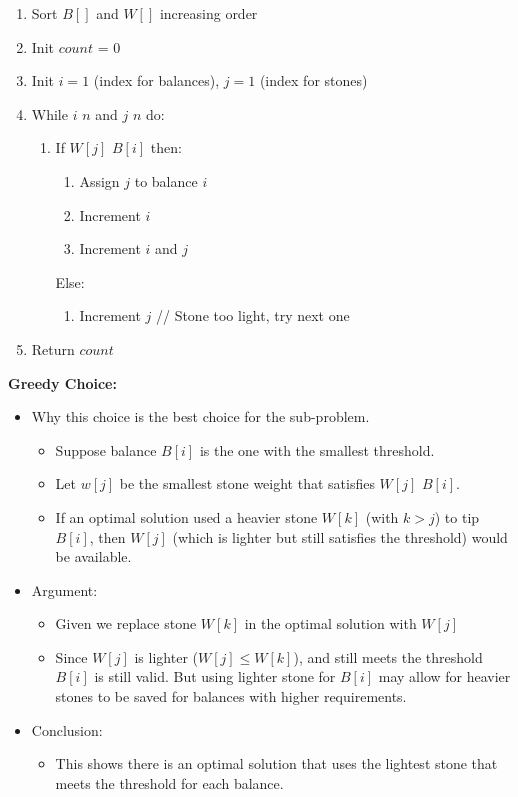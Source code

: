 \documentclass{article}[12pt]
\begin{document}
\begin{enumerate}
  \item Sort $B[]$ and $W[]$ increasing order
  \item Init $count$ = 0
  \item Init $i = 1$ (index for balances), $j = 1$ (index for stones)
  \item While $i$ \leq $n$ and $j$ \leq $n$ do:
    \begin{enumerate}
      \item If $W[j]$ \leq $B[i]$ then:
        \begin{enumerate}
          \item Assign $j$ to balance $i$
          \item Increment $i$
          \item Increment $i$ and $j$
        \end{enumerate}
        Else:
        \begin{enumerate}
          \item Increment $j$ // Stone too light, try next one
        \end{enumerate}
    \end{enumerate}
  \item Return $count$
\end{enumerate}
\noindent\textbf{Greedy Choice:} \\
\begin{itemize}
  \item Why this choice is the best choice for the sub-problem.
    \begin{itemize}
      \item Suppose balance $B[i]$ is the one with the smallest threshold.
      \item Let $w[j]$ be the smallest stone weight 
        that satisfies $W[j]$ \geq $B[i]$.
      \item If an optimal solution used a heavier stone $W[k]$ (with $k>j$) to tip
        $B[i]$, then $W[j]$ (which is lighter but still satisfies the threshold)
        would be available.
    \end{itemize}
  \item Argument:
    \begin{itemize}
      \item Given we replace stone $W[k]$ in the optimal solution with $W[j]$
      \item Since $W[j]$ is lighter ($W[j] \leq W[k]$), and still meets
        the threshold $B[i]$ is still valid. But using lighter stone for $B[i]$
        may allow for heavier stones to be saved for balances with higher requirements.
    \end{itemize}
  \item Conclusion:
    \begin{itemize}
      \item This shows there is an optimal solution that uses the lightest stone
        that meets the threshold for each balance.
    \end{itemize}
\end{itemize}
\end{document}

